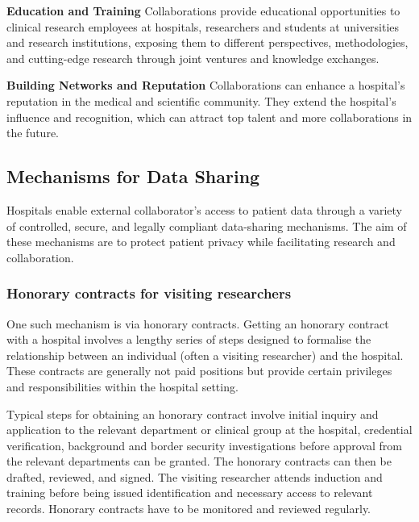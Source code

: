 \documentclass[11pt]{article}
\begin{document}
\textbf{Education and Training} Collaborations provide educational opportunities to clinical research employees at hospitals, researchers and students at universities and research institutions, exposing them to different perspectives, methodologies, and cutting-edge research through joint ventures and knowledge exchanges.

\textbf{Building Networks and Reputation} Collaborations can enhance a hospital’s reputation in the medical and scientific community. They extend the hospital’s influence and recognition, which can attract top talent and more collaborations in the future.

\subsection{Mechanisms for Data Sharing}

Hospitals enable external collaborator's access to patient data through a variety of controlled, secure, and legally compliant data-sharing mechanisms. The aim of these mechanisms are to protect patient privacy while facilitating research and collaboration. 

\subsubsection{Honorary contracts for visiting researchers}


One such mechanism is via honorary contracts. Getting an honorary contract with a hospital involves a lengthy series of steps designed to formalise the relationship between an individual (often a visiting researcher) and the hospital. These contracts are generally not paid positions but provide certain privileges and responsibilities within the hospital setting. 

Typical steps for obtaining an honorary contract involve initial inquiry and application to the relevant department or clinical group at the hospital, credential verification, background and border security investigations before approval from the relevant departments can be granted. The honorary contracts can then be drafted, reviewed, and signed. The visiting researcher attends induction and training before being issued identification and necessary access to relevant records. Honorary contracts have to be monitored and reviewed regularly. 
\end{document}
